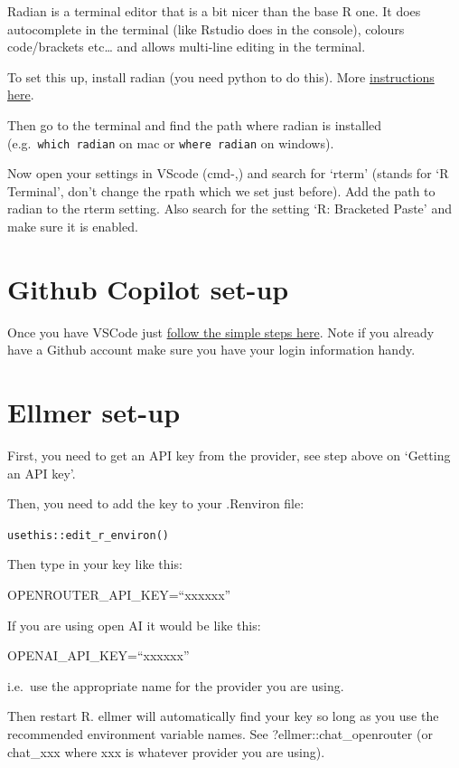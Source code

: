 \documentclass[
  letterpaper,
  DIV=11,
  numbers=noendperiod]{scrreprt}
\begin{document}
Radian is a terminal editor that is a bit nicer than the base R one. It
does autocomplete in the terminal (like Rstudio does in the console),
colours code/brackets etc\ldots{} and allows multi-line editing in the
terminal.

To set this up, install radian (you need python to do this). More
\href{https://github.com/randy3k/radian?tab=readme-ov-file}{instructions
here}.

Then go to the terminal and find the path where radian is installed
(e.g.~\texttt{which\ radian} on mac or \texttt{where\ radian} on
windows).

Now open your settings in VScode (cmd-,) and search for `rterm' (stands
for `R Terminal', don't change the rpath which we set just before). Add
the path to radian to the rterm setting. Also search for the setting `R:
Bracketed Paste' and make sure it is enabled.

\section{Github Copilot set-up}\label{sec-githubcopilot}

Once you have VSCode just
\href{https://docs.github.com/en/copilot/how-tos/manage-your-account/get-started-with-a-copilot-plan\#visual-studio-and-vs-code}{follow
the simple steps here}. Note if you already have a Github account make
sure you have your login information handy.

\section{Ellmer set-up}\label{sec-ellmer}

First, you need to get an API key from the provider, see step above on
`Getting an API key'.

Then, you need to add the key to your .Renviron file:

\texttt{usethis::edit\_r\_environ()}

Then type in your key like this:

OPENROUTER\_API\_KEY=``xxxxxx''

If you are using open AI it would be like this:

OPENAI\_API\_KEY=``xxxxxx''

i.e.~use the appropriate name for the provider you are using.

Then restart R. ellmer will automatically find your key so long as you
use the recommended environment variable names. See
?ellmer::chat\_openrouter (or chat\_xxx where xxx is whatever provider
you are using).
\end{document}
